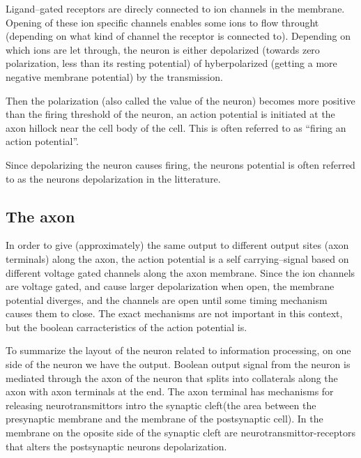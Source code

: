 Ligand--gated receptors are direcly connected to ion channels in the membrane. Opening of these ion specific channels enables some ions to flow throught (depending on what kind of channel the receptor is connected to). 
Depending on which ions are let through, the neuron is either depolarized (towards zero polarization, less than its resting potential) of hyberpolarized (getting a more negative membrane potential) by the transmission.

Then the polarization (also called the value of the neuron) becomes more positive than the firing threshold of the neuron, an action potential is initiated at the axon hillock near the cell body of the cell. 
This is often referred to as ``firing an action potential''.

Since depolarizing the neuron causes firing, the neurons potential is often referred to as the neurons depolarization in the litterature.



\subsection{The axon}

In order to give (approximately) the same output to different output sites (axon terminals) along the axon, the action potential %
is a self carrying--signal based on different voltage gated channels along the axon membrane. 
Since the ion channels are voltage gated, and cause larger depolarization when open, the membrane potential diverges, and the channels are open until some timing mechanism causes them to close. 
The exact mechanisms are not important in this context, but the boolean carracteristics of the action potential is. 

To summarize the layout of the neuron related to information processing, on one side of the neuron we have the output. Boolean output signal from the neuron is mediated through the axon of the neuron that splits into collaterals along the axon with axon terminals at the end. The axon terminal has mechanisms for releasing neurotransmittors intro the synaptic cleft(the area between the presynaptic membrane and the membrane of the postsynaptic cell). 
In the membrane on the oposite side of the synaptic cleft are neurotransmittor-receptors that alters the postsynaptic neurons depolarization. %

